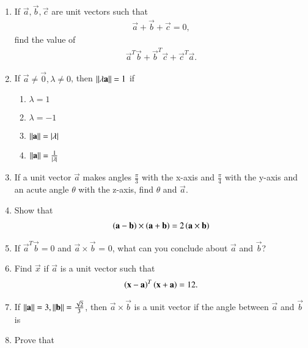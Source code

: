 \begin{enumerate}[label=\arabic*.,ref=\thesubsection.\theenumi]
\item If $\vec{a},\vec{b},\vec{c}$ are unit vectors such that 
\begin{align}
\vec{a}+\vec{b}+\vec{c} = 0,
\end{align}
find the value of 
\begin{align}
\vec{a}^T\vec{b}+\vec{b}^T\vec{c}+\vec{c}^T\vec{a}.
\end{align}
\item If $\vec{a} \ne \vec{0}, \lambda \ne 0$, then $\left\lVert\lambda \mathbf{a}\right\rVert = 1$ if
\begin{enumerate}
\item $\lambda =1$
\item $\lambda = -1$
\item $\left\lVert\mathbf{a}\right\rVert=\left\vert\lambda\right\vert$
\item $\left\lVert\mathbf{a}\right\rVert=\frac{1}{\left\vert\lambda\right\vert}$
\end{enumerate}
\item If a unit vector $\vec{a}$ makes angles $\frac{\pi}{3}$ with the x-axis and $\frac{\pi}{4}$ with the y-axis and an acute angle $\theta$ with the z-axis, find $\theta$ and $\vec{a}$.
\item Show that 
\begin{align}
\left(\mathbf{a}-\mathbf{b}\right)\times \left(\mathbf{a}+\mathbf{b}\right) = 2\left(\mathbf{a}\times\mathbf{b}\right)
\end{align}
\item If $\vec{a}^T\vec{b} = 0$ and $\vec{a}\times \vec{b}$ = 0, what can you conclude about $\vec{a}$ and $\vec{b}$?
\item Find $\vec{x}$ if  $\vec{a}$ is a unit vector such that
\begin{align}
\left(\mathbf{x}-\mathbf{a}\right)^T\left(\mathbf{x}+\mathbf{a}\right) = 12.
\end{align}
\item If $\left\lVert\mathbf{a}\right\rVert = 3, \left\lVert\mathbf{b}\right\rVert =\frac{\sqrt{2}}{3}$, then $\vec{a}\times \vec{b}$ is a unit vector if the angle between $\vec{a}$ and $\vec{b}$ is 
\begin{enumerate}[itemsep = 2pt]
\end{enumerate}
\item Prove that 
\begin{align}

\end{align}
\end{enumerate}
